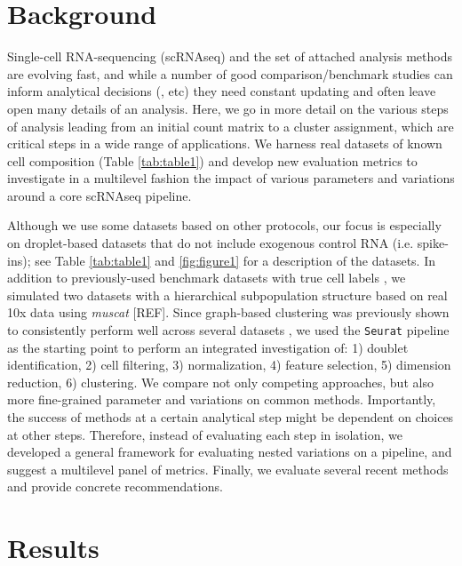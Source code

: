\documentclass{bmcart}
\begin{document}

\section*{Background}

Single-cell RNA-sequencing (scRNAseq) and the set of attached analysis methods are evolving fast, and while a number of good comparison/benchmark studies can inform analytical decisions (\citealp{duoClustering2018}, etc) they need constant updating and often leave open many details of an analysis. Here, we go in more detail on the various steps of analysis leading from an initial count matrix to a cluster assignment, which are critical steps in a wide range of applications. We harness real datasets of known cell composition (Table \ref{tab:table1}) and develop new evaluation metrics to investigate in a multilevel fashion the impact of various parameters and variations around a core scRNAseq pipeline.

Although we use some datasets based on other protocols, our focus is especially on droplet-based datasets that do not include exogenous control RNA (i.e. spike-ins); see Table \ref{tab:table1} and \ref{fig:figure1} for a description of the datasets. In addition to previously-used benchmark datasets with true cell labels \cite{duoClustering2018,tianMixology2018}, we simulated two datasets with a hierarchical subpopulation structure based on real 10x data using \textit{muscat} [REF]. 
Since graph-based clustering  \cite{satijaSeurat2015} was previously shown to consistently perform well across several datasets \cite{duoClustering2018,tianMixology2018}, we used the \texttt{Seurat} pipeline as the starting point to perform an integrated investigation of: 1) doublet identification, 2) cell filtering, 3) normalization, 4) feature selection, 5) dimension reduction, 6) clustering. We compare not only competing approaches, but also more fine-grained parameter and variations on common methods. Importantly, the success of methods at a certain analytical step might be dependent on choices at other steps. Therefore, instead of evaluating each step in isolation, we developed a general framework for evaluating nested variations on a pipeline, and suggest a multilevel panel of metrics. Finally, we evaluate several recent methods and provide concrete recommendations.

\section*{Results}
\end{document}
